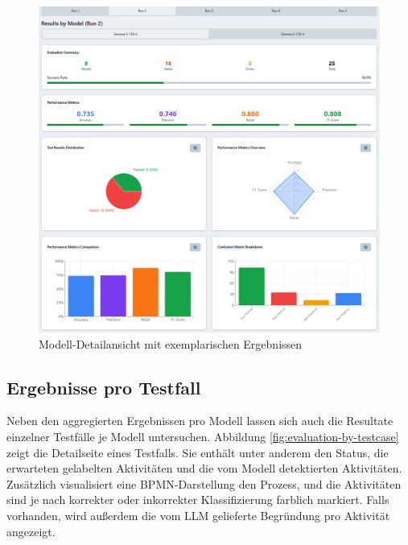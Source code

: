 \begin{figure}[h]
    \centering
    \includegraphics[width=\textwidth]{images/evaluation/evaluation-result-by-model_new}
    \caption{Modell-Detailansicht mit exemplarischen Ergebnissen}
    \label{fig:evaluation-by-model}
\end{figure}

\subsection*{Ergebnisse pro Testfall}

Neben den aggregierten Ergebnissen pro Modell lassen sich auch die Resultate einzelner Testfälle je Modell untersuchen. Abbildung \ref{fig:evaluation-by-testcase} zeigt die Detailseite eines Testfalls. Sie enthält unter anderem den Status, die erwarteten gelabelten Aktivitäten und die vom Modell detektierten Aktivitäten. Zusätzlich visualisiert eine \ac{BPMN}-Darstellung den Prozess, und die Aktivitäten sind je nach korrekter oder inkorrekter Klassifizierung farblich markiert. Falls vorhanden, wird außerdem die vom  \ac{LLM} gelieferte Begründung pro Aktivität angezeigt.

